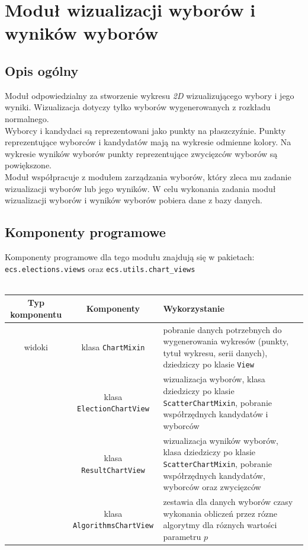 \documentclass[pdflatex,11pt]{../aghdoc_version2}
\newcommand{\code}[1]{\texttt{#1}}
\begin{document}
\section{Moduł wizualizacji wyborów i wyników wyborów}
\subsection{Opis ogólny}
Moduł odpowiedzialny za stworzenie wykresu \textit{2D} wizualizującego wybory i jego wyniki.
Wizualizacja dotyczy tylko wyborów wygenerowanych z rozkładu normalnego.\\ Wyborcy i
kandydaci są reprezentowani jako punkty na płaszczyźnie. Punkty reprezentujące wyborców
i kandydatów mają na wykresie odmienne kolory. Na wykresie wyników wyborów punkty
reprezentujące zwycięzców wyborów są powiększone.\\ Moduł współpracuje z modułem
zarządzania wyborów, który zleca mu zadanie wizualizacji wyborów lub jego wyników. W
celu wykonania zadania moduł wizualizacji wyborów i wyników wyborów pobiera dane z
bazy danych.

\subsection{Komponenty programowe}
Komponenty programowe dla tego modułu znajdują się w pakietach:  \code{ecs.elections.views} oraz \code{ecs.utils.chart\_views} \\ \\
\begin{tabular}{|c|c|p{5cm}|}
\hline
\textbf{Typ komponentu} & \textbf{Komponenty} & \textbf{Wykorzystanie} \\
\hline
widoki & klasa \code{ChartMixin} & pobranie danych potrzebnych do
wygenerowania wykresów (punkty, tytuł
wykresu, serii danych), dziedziczy po
klasie \code{View} \\
\cline{2-3}
 & klasa \code{ElectionChartView} & wizualizacja wyborów, klasa dziedziczy
po klasie \code{ScatterChartMixin}, pobranie
współrzędnych kandydatów i wyborców \\
\cline{2-3}
 & klasa \code{ResultChartView} & wizualizacja wyników wyborów, klasa
dziedziczy po klasie \code{ScatterChartMixin},
pobranie współrzędnych kandydatów,
wyborców oraz zwycięzców \\
\cline{2-3}
& klasa \code{AlgorithmsChartView} & zestawia dla danych wyborów czasy wykonania obliczeń  przez rózne algorytmy dla róznych wartości parametru $p$\\
\hline

\end{tabular}
\clearpage
\end{document}
